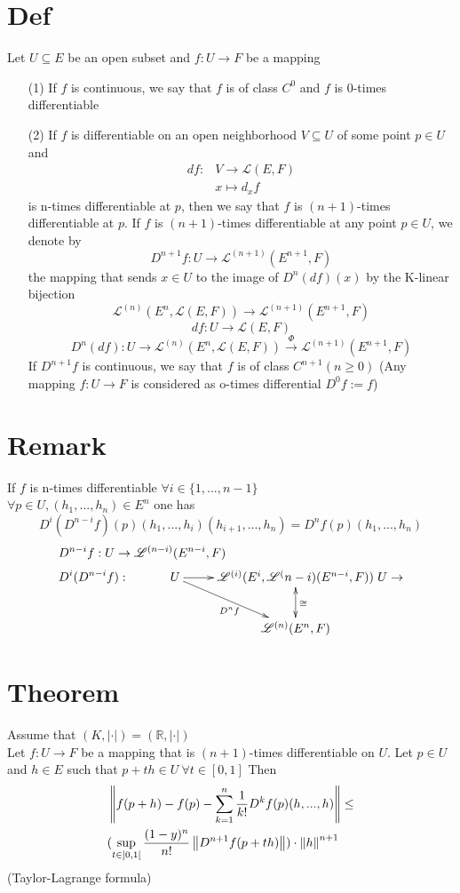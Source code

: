 \documentclass{book}
\newcommand{\abs}[1]{\left\lvert #1 \right\rvert}
\begin{document}
\section{Def}
Let $U\subseteq E$ be an open subset and $f:U\rightarrow F$ be a mapping
\begin{itemize}
    \item [(1)]If $f$ is continuous, we say that $f$ is of class $C^0$ and $f$ is 0-times differentiable
    \item [(2)]If $f$ is differentiable on an open neighborhood $V\subseteq U$ of some point $p\in U$ and 
    $$\begin{aligned}
        df: &V\rightarrow \mathscr{L}(E,F)\\
        &x\mapsto d_xf
    \end{aligned}$$
    is n-times differentiable at $p$, then we say that $f$ is $(n+1)$-times differentiable at $p$. If $f$ is $(n+1)$-times differentiable at any point $p\in U$, we denote by $$D^{n+1}f:U\rightarrow \mathscr{L}^{(n+1)}(E^{n+1},F)$$
    the mapping that sends $x\in U$ to the image of $D^n(df)(x)$ by the K-linear bijection
    $$\mathscr{L}^{(n)}(E^n,\mathscr{L}(E,F))\rightarrow\mathscr{L}^{(n+1)}(E^{n+1},F)$$
    $$df:U\rightarrow\mathscr{L}(E,F)$$
    $$
    D^n(df):U\rightarrow\mathscr{L}^{(n)}(E^n,\mathscr{L}(E,F))\stackrel{\Phi}{\longrightarrow}\mathscr{L}^{(n+1)}(E^{n+1},F)$$
    If $D^{n+1}f$ is continuous, we say that $f$ is of class $C^{n+1}(n\geq0)$
    (Any mapping $f:U\rightarrow F$ is considered as o-times differential $D^0f:=f$)
\end{itemize}
\section{Remark}
If $f$ is n-times differentiable $\forall i\in \{1,...,n-1\}$\\
$\forall p\in U,(h_1,...,h_n)\in E^n$ one has 
$$D^i(D^{n-i}f)(p)(h_1,...,h_i)(h_{i+1},...,h_n)=D^nf(p)(h_1,...,h_n)$$
$$\begin{aligned}
    &D^{n-i}f:U\rightarrow \mathscr{L}^{(n-i)}(E^{n-i},F)\\
    & D^i(D^{n-i}f):
    \xymatrix{
        &U\ar[rd]_{D^nf}\ar[r]&\mathscr{L}^{(i)}(E^i,\mathscr{L}^(n-i)(E^{n-i},F))\ar@{<->}[d]^\cong \\
        & &\mathscr{L}^{(n)}(E^n,F)
    }
    U\rightarrow
\end{aligned}$$
\section{Theorem}
Assume that $(K,\abs\cdot)=(\mathbb{R},\abs\cdot)$ \\
Let $f:U\rightarrow F$ be a mapping that is $(n+1)$-times differentiable on $U$. Let $p\in U$ and $h\in E$ such that $p+th\in U\ \forall t\in [0,1]$ Then 
$$\begin{aligned}
    &\left\lVert f(p+h)-f(p)-\sum\limits_{k=1}^n\frac{1}{k!}D^kf(p)(h,...,h) \right\rVert\leq\\
    &(\sup\limits_{t\in {]0,1[}}\frac{(1-y)^n}{n!}\left\lVert D^{n+1}f(p+th) \right\rVert)\cdot\left\lVert h \right\rVert^{n+1}
\end{aligned}$$
(Taylor-Lagrange formula)
\end{document}
